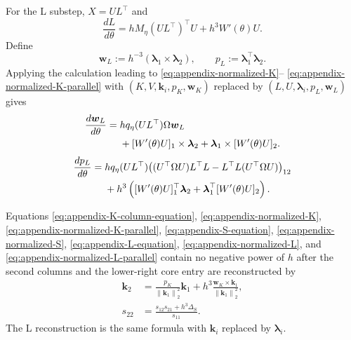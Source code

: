 \documentclass[10pt,a4paper]{amsart}
\numberwithin{equation}{section}
\newcommand{\norm}[1]{\left\lVert #1\right\rVert}
\begin{document}
For the L substep, $X=UL^\top$ and
\begin{equation}\label{eq:appendix-L-equation}
 \frac{dL}{d\theta}
 =hM_\eta(UL^\top)^\top U+h^3W'(\theta)U.
\end{equation}
Define
\begin{equation}\label{eq:appendix-L-area-definition}
 \boldsymbol w_L:=h^{-3}(\boldsymbol\lambda_1\times\boldsymbol\lambda_2),
 \qquad p_L:=\boldsymbol\lambda_1^\top\boldsymbol\lambda_2.
\end{equation}
Applying the calculation leading to
\eqref{eq:appendix-normalized-K}--
\eqref{eq:appendix-normalized-K-parallel} with
$(K,V,\boldsymbol k_i,p_K,\boldsymbol w_K)$ replaced by
$(L,U,\boldsymbol\lambda_i,p_L,\boldsymbol w_L)$ gives
\begin{align}
 \frac{d\boldsymbol w_L}{d\theta}
 ={}&hq_\eta(UL^\top)\Omega
 \boldsymbol w_L
 \notag\\
 &+[W'(\theta)U]_1\times\boldsymbol\lambda_2
 +\boldsymbol\lambda_1\times[W'(\theta)U]_2.
 \label{eq:appendix-normalized-L}
\end{align}
\begin{align}
 \frac{dp_L}{d\theta}
 ={}&hq_\eta(UL^\top)
 \bigl((U^\top\Omega U)L^\top L
       -L^\top L(U^\top\Omega U)\bigr)_{12}\notag\\
 &+h^3\left(
 [W'(\theta)U]_1^\top\boldsymbol\lambda_2
 +\boldsymbol\lambda_1^\top[W'(\theta)U]_2\right).
 \label{eq:appendix-normalized-L-parallel}
\end{align}

Equations \eqref{eq:appendix-K-column-equation},
\eqref{eq:appendix-normalized-K},
\eqref{eq:appendix-normalized-K-parallel},
\eqref{eq:appendix-S-equation},
\eqref{eq:appendix-normalized-S},
\eqref{eq:appendix-L-equation},
\eqref{eq:appendix-normalized-L}, and
\eqref{eq:appendix-normalized-L-parallel} contain no negative power of
$h$ after the second columns and the lower-right core entry are
reconstructed by
\begin{align}
 \boldsymbol k_2
 &=\frac{p_K}{\norm{\boldsymbol k_1}_2^2}\boldsymbol k_1
 +h^3\frac{\boldsymbol w_K\times\boldsymbol k_1}
 {\norm{\boldsymbol k_1}_2^2},
 \label{eq:appendix-QR-reconstruction}\\
 s_{22}&=\frac{s_{12}s_{21}+h^3\Delta_S}{s_{11}}.
 \label{eq:appendix-core-reconstruction}
\end{align}
The L reconstruction is the same formula with
\(\boldsymbol k_i\) replaced by \(\boldsymbol\lambda_i\).
\end{document}
